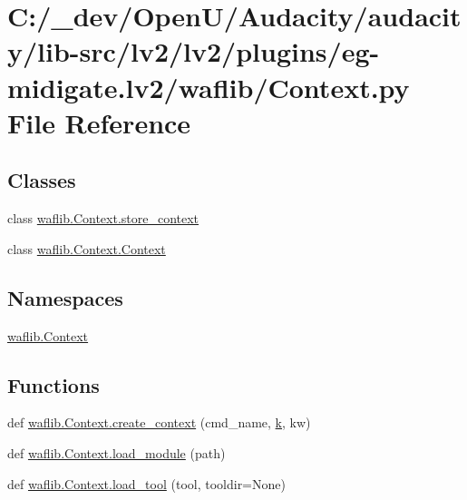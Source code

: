 \hypertarget{lv2_2plugins_2eg-midigate_8lv2_2waflib_2_context_8py}{}\section{C\+:/\+\_\+dev/\+Open\+U/\+Audacity/audacity/lib-\/src/lv2/lv2/plugins/eg-\/midigate.lv2/waflib/\+Context.py File Reference}
\label{lv2_2plugins_2eg-midigate_8lv2_2waflib_2_context_8py}
\subsection*{Classes}
\begin{DoxyCompactItemize}
\item 
class \hyperlink{classwaflib_1_1_context_1_1store__context}{waflib.\+Context.\+store\+\_\+context}
\item 
class \hyperlink{classwaflib_1_1_context_1_1_context}{waflib.\+Context.\+Context}
\end{DoxyCompactItemize}
\subsection*{Namespaces}
\begin{DoxyCompactItemize}
\item 
 \hyperlink{namespacewaflib_1_1_context}{waflib.\+Context}
\end{DoxyCompactItemize}
\subsection*{Functions}
\begin{DoxyCompactItemize}
\item 
def \hyperlink{namespacewaflib_1_1_context_a224d64e5e44f9aae4903dc52235d6470}{waflib.\+Context.\+create\+\_\+context} (cmd\+\_\+name, \hyperlink{rfft2d_test_m_l_8m_adc468c70fb574ebd07287b38d0d0676d}{k}, kw)
\item 
def \hyperlink{namespacewaflib_1_1_context_ae0923656ff2aebede696050061d6d48d}{waflib.\+Context.\+load\+\_\+module} (path)
\item 
def \hyperlink{namespacewaflib_1_1_context_a2f9fe1693a40a8fa972154b9eeec3424}{waflib.\+Context.\+load\+\_\+tool} (tool, tooldir=None)
\end{DoxyCompactItemize}
